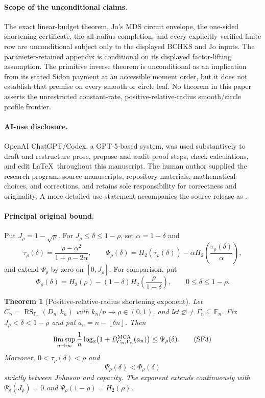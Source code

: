 \documentclass[11pt,a4paper]{amsart}
\numberwithin{equation}{section}
\newtheorem{theorem}{Theorem}[section]
\theoremstyle{remark}
\DeclareMathOperator{\RS}{RS}
\newcommand{\F}{\mathbb F}
\newcommand{\floor}[1]{\left\lfloor #1\right\rfloor}
\begin{document}
\paragraph{Scope of the unconditional claims.}
The exact linear-budget theorem, Jo's MDS circuit envelope, the one-sided
shortening certificate, the all-radius completion, and every explicitly
verified finite row are unconditional subject only to the displayed BCHKS
and Jo inputs.  The parameter-retained appendix is
conditional on its displayed factor-lifting assumption.  The primitive
inverse theorem is unconditional as an implication from its stated Sidon
payment at an accessible moment order, but it does not establish that
premise on every smooth or circle leaf.  No theorem in this paper asserts the unrestricted
constant-rate, positive-relative-radius smooth/circle profile frontier.

\paragraph{AI-use disclosure.}
OpenAI ChatGPT/Codex, a GPT-5-based system, was used substantively to draft
and restructure prose, propose and audit proof steps, check calculations,
and edit \LaTeX\ throughout this manuscript.  The human author supplied the
research program, source manuscripts, repository materials, mathematical
choices, and corrections, and retains sole responsibility for correctness
and originality.  A more detailed use statement accompanies the source
release as .

\paragraph{Principal original bound.}
Put \(J_\rho=1-\sqrt\rho\).  For
\(J_\rho\le\delta\le1-\rho\), set \(\alpha=1-\delta\) and
\[
 \tau_\rho(\delta)=\frac{\rho-\alpha^2}{1+\rho-2\alpha},\qquad
 \Psi_\rho(\delta)=H_2(\tau_\rho(\delta))
 -\alpha H_2\!\left(\frac{\tau_\rho(\delta)}{\alpha}\right), \tag{SF1}
 \label{eq:intro-Psi}
\]
and extend \(\Psi_\rho\) by zero on \([0,J_\rho]\).  For comparison, put
\[
 \Phi_\rho(\delta)=H_2(\rho)
 -(1-\delta)H_2\!\left(\frac{\rho}{1-\delta}\right),
 \qquad 0\le\delta\le1-\rho.                       \tag{SF2}
 \label{eq:intro-Phi}
\]

\begin{theorem}[Positive-relative-radius shortening exponent]
\label{thm:intro-shortening-exponent}
Let \(C_n=\RS_{\F_n}(D_n,k_n)\) with \(k_n/n\to\rho\in(0,1)\), and let
\(\varnothing\ne\Gamma_n\subseteq\F_n\).  Fix
\(J_\rho<\delta<1-\rho\) and put
\(a_n=n-\floor{\delta n}\).  Then
\[
 \limsup_{n\to\infty}\frac1n\log_2
 \bigl(1+B_{C_n,\Gamma_n}^{\rm MCA}(a_n)\bigr)
 \le\Psi_\rho(\delta).                             \tag{SF3}
 \label{eq:shortening-exponent-bound}
\]
Moreover, \(0<\tau_\rho(\delta)<\rho\) and
\[
 \Psi_\rho(\delta)<\Phi_\rho(\delta)              \tag{SF4}
 \label{eq:shortening-beats-circuit}
\]
strictly between Johnson and capacity.  The exponent extends continuously
with \(\Psi_\rho(J_\rho)=0\) and
\(\Psi_\rho(1-\rho)=H_2(\rho)\).
\end{theorem}
\end{document}
